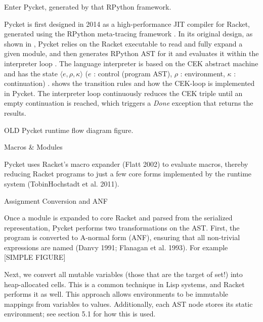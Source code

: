         \begin{paragraph-here}
            Enter Pycket, generated by that RPython framework.

            Pycket is first designed in 2014 as a high-performance JIT compiler
            for Racket, generated using the RPython meta-tracing framework
            \cite{bolz14-racket}. In its original design, as shown in
            , Pycket relies on the Racket executable to
            read and fully expand a given module\cite{samth:11}, and then
            generates RPython AST for it and evaluates it within the interpreter
            loop \cite{pycket15}. The language interpreter is based on the CEK
            abstract machine and has the state $\langle e, \rho, \kappa \rangle$ ($e$ : control
            (program AST), $\rho$ : environment, $\kappa$ : continuation)
            \cite{felleisen87}.  shows the transition rules and
            how the CEK-loop is implemented in Pycket. The interpreter loop
            continuously reduces the CEK triple until an empty continuation is
            reached, which triggers a \emph{Done} exception that returns the
            results.
        \end{paragraph-here}


        \begin{figure-here}
            OLD Pycket runtime flow diagram figure.
        \end{figure-here}

        Macros \& Modules

        Pycket uses Racket’s macro expander (Flatt 2002) to evaluate macros, thereby reducing Racket programs to just a few core forms implemented by the runtime system (TobinHochstadt et al. 2011).

        Assignment Conversion and ANF

        Once a module is expanded to core Racket and parsed from the serialized representation, Pycket performs two transformations on the AST. First, the program is converted to A-normal form (ANF), ensuring that all non-trivial expressions are named (Danvy 1991; Flanagan et al. 1993). For example [SIMPLE FIGURE]

        Next, we convert all mutable variables (those that are the target of set!) into heap-allocated cells. This is a common technique in Lisp systems, and Racket performs it as well. This approach allows environments to be immutable mappings from variables to values. Additionally, each AST node stores its static environment; see section 5.1 for how this is used.

